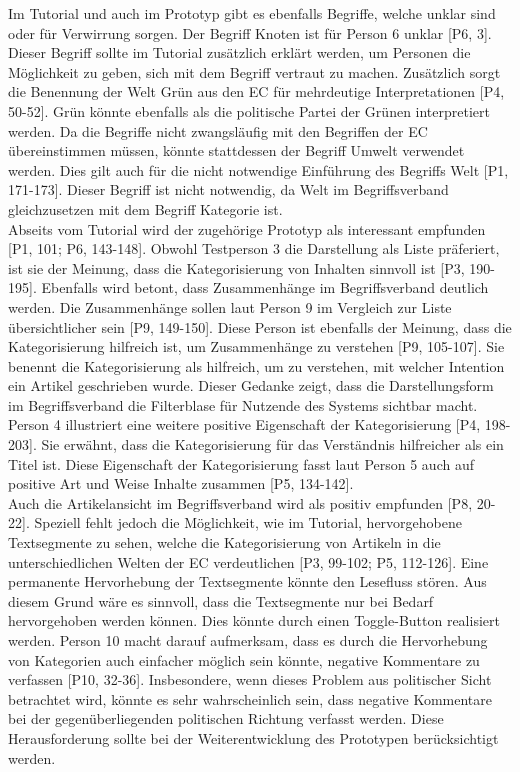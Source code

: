 Im Tutorial und auch im Prototyp gibt es ebenfalls Begriffe, welche unklar sind oder für Verwirrung sorgen.
Der Begriff Knoten ist für Person 6 unklar [P6, 3].
Dieser Begriff sollte im Tutorial zusätzlich erklärt werden, um Personen die Möglichkeit zu geben, sich mit dem Begriff vertraut zu machen.
Zusätzlich sorgt die Benennung der Welt Grün aus den \ac{EC} für mehrdeutige Interpretationen [P4, 50-52].
Grün könnte ebenfalls als die politische Partei der Grünen interpretiert werden.
Da die Begriffe nicht zwangsläufig mit den Begriffen der \ac{EC} übereinstimmen müssen, könnte stattdessen der Begriff Umwelt verwendet werden.
Dies gilt auch für die nicht notwendige Einführung des Begriffs Welt [P1, 171-173].
Dieser Begriff ist nicht notwendig, da Welt im Begriffsverband gleichzusetzen mit dem Begriff Kategorie ist.\\

Abseits vom Tutorial wird der zugehörige Prototyp als interessant empfunden [P1, 101; P6, 143-148].
Obwohl Testperson 3 die Darstellung als Liste präferiert, ist sie der Meinung, dass die Kategorisierung von Inhalten sinnvoll ist [P3, 190-195].
Ebenfalls wird betont, dass Zusammenhänge im Begriffsverband deutlich werden.
Die Zusammenhänge sollen laut Person 9 im Vergleich zur Liste übersichtlicher sein [P9, 149-150].
Diese Person ist ebenfalls der Meinung, dass die Kategorisierung hilfreich ist, um Zusammenhänge zu verstehen [P9, 105-107].
Sie benennt die Kategorisierung als hilfreich, um zu verstehen, mit welcher Intention ein Artikel geschrieben wurde.
Dieser Gedanke zeigt, dass die Darstellungsform im Begriffsverband die Filterblase für Nutzende des Systems sichtbar macht.
Person 4 illustriert eine weitere positive Eigenschaft der Kategorisierung [P4, 198-203].
Sie erwähnt, dass die Kategorisierung für das Verständnis hilfreicher als ein Titel ist.
Diese Eigenschaft der Kategorisierung fasst laut Person 5 auch auf positive Art und Weise Inhalte zusammen [P5, 134-142].\\

Auch die Artikelansicht im Begriffsverband wird als positiv empfunden [P8, 20-22].
Speziell fehlt jedoch die Möglichkeit, wie im Tutorial, hervorgehobene Textsegmente zu sehen, welche die Kategorisierung von Artikeln in die unterschiedlichen Welten der \ac{EC} verdeutlichen [P3, 99-102; P5, 112-126].
Eine permanente Hervorhebung der Textsegmente könnte den Lesefluss stören.
Aus diesem Grund wäre es sinnvoll, dass die Textsegmente nur bei Bedarf hervorgehoben werden können.
Dies könnte durch einen Toggle-Button realisiert werden.
Person 10 macht darauf aufmerksam, dass es durch die Hervorhebung von Kategorien auch einfacher möglich sein könnte, negative Kommentare zu verfassen [P10, 32-36].
Insbesondere, wenn dieses Problem aus politischer Sicht betrachtet wird, könnte es sehr wahrscheinlich sein, dass negative Kommentare bei der gegenüberliegenden politischen Richtung verfasst werden.
Diese Herausforderung sollte bei der Weiterentwicklung des Prototypen berücksichtigt werden.\\

